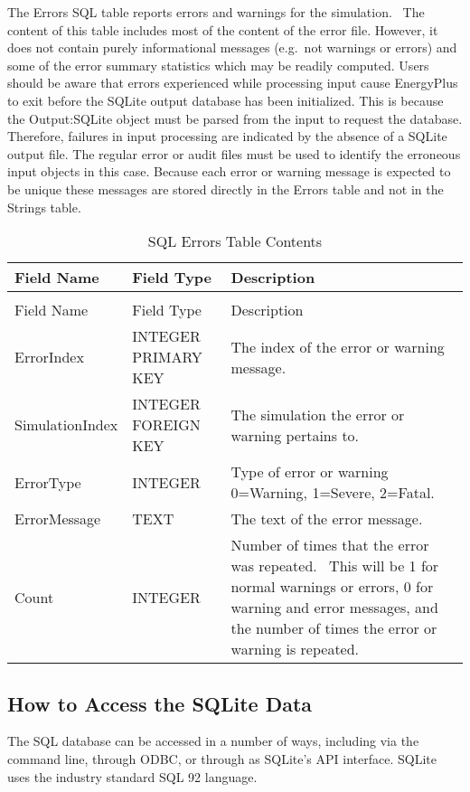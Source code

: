 The Errors SQL table reports errors and warnings for the simulation.~ The content of this table includes most of the content of the error file. However, it does not contain purely informational messages (e.g.~not warnings or errors) and some of the error summary statistics which may be readily computed. Users should be aware that errors experienced while processing input cause EnergyPlus to exit before the SQLite output database has been initialized. This is because the Output:SQLite object must be parsed from the input to request the database. Therefore, failures in input processing are indicated by the absence of a SQLite output file. The regular error or audit files must be used to identify the erroneous input objects in this case. Because each error or warning message is expected to be unique these messages are stored directly in the Errors table and not in the Strings table.

\begin{longtable}[c]{>{\raggedright}p{1.5in}>{\raggedright}p{1.5in}>{\raggedright}p{3in}}
\caption{SQL Errors Table Contents \label{table:table-42.-sql-errors-table-contents}} \tabularnewline
\toprule 
Field Name & Field Type & Description \tabularnewline
\midrule
\endfirsthead

\caption[]{SQL Errors Table Contents} \tabularnewline
\toprule 
Field Name & Field Type & Description \tabularnewline
\midrule
\endhead

ErrorIndex & INTEGER PRIMARY KEY & The index of the error or warning message. \tabularnewline
SimulationIndex & INTEGER FOREIGN KEY & The simulation the error or warning pertains to. \tabularnewline
ErrorType & INTEGER & Type of error or warning 0=Warning, 1=Severe, 2=Fatal. \tabularnewline
ErrorMessage & TEXT & The text of the error message. \tabularnewline
Count & INTEGER & Number of times that the error was repeated.~ This will be 1 for normal warnings or errors, 0 for warning and error messages, and the number of times the error or warning is repeated. \tabularnewline
\bottomrule
\end{longtable}

\subsection{How to Access the SQLite Data}\label{how-to-access-the-sqlite-data}

The SQL database can be accessed in a number of ways, including via the command line, through ODBC, or through as SQLite's API interface. SQLite uses the industry standard SQL 92 language.

